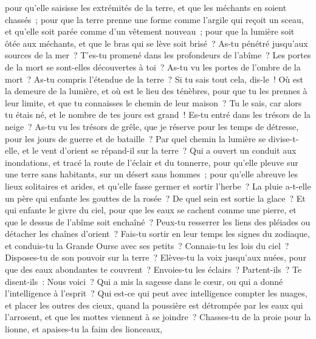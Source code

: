 \begin{multicols}{2}
pour qu'elle saisisse les extrémités de la terre, et que les méchants en soient chassés~;
pour que la terre prenne une forme comme l'argile qui reçoit un sceau, et qu'elle soit parée comme d'un vêtement nouveau~;
pour que la lumière soit ôtée aux méchants, et que le bras qui se lève soit brisé~?
As-tu pénétré jusqu'aux sources de la mer~? T'es-tu promené dans les profondeurs de l'abîme~?
Les portes de la mort se sont-elles découvertes à toi~? As-tu vu les portes de l'ombre de la mort~?
As-tu compris l'étendue de la terre~? Si tu sais tout cela, dis-le~!
Où est la demeure de la lumière, et où est le lieu des ténèbres,
pour que tu les prennes à leur limite, et que tu connaisses le chemin de leur maison~?
Tu le sais, car alors tu étais né, et le nombre de tes jours est grand~!
Es-tu entré dans les trésors de la neige~? As-tu vu les trésors de grêle,
que je réserve pour les temps de détresse, pour les jours de guerre et de bataille~?
Par quel chemin la lumière se divise-t-elle, et le vent d'orient se répand-il sur la terre~?
Qui a ouvert un conduit aux inondations, et tracé la route de l'éclair et du tonnerre,
pour qu'elle pleuve sur une terre sans habitants, sur un désert sans hommes~;
pour qu'elle abreuve les lieux solitaires et arides, et qu'elle fasse germer et sortir l'herbe~?
La pluie a-t-elle un père qui enfante les gouttes de la rosée~?
De quel sein est sortie la glace~? Et qui enfante le givre du ciel,
pour que les eaux se cachent comme une pierre, et que le dessus de l'abîme soit enchaîné~?
Peux-tu resserrer les liens des pléiades ou détacher les chaînes d'orient~?
Fais-tu sortir en leur temps les signes du zodiaque, et conduis-tu la Grande Ourse avec ses petits~?
Connais-tu les lois du ciel~? Disposes-tu de son pouvoir sur la terre~?
Elèves-tu la voix jusqu'aux nuées, pour que des eaux abondantes te couvrent~?
Envoies-tu les éclairs~? Partent-ils~? Te disent-ils~: Nous voici~?
Qui a mis la sagesse dans le cœur, ou qui a donné l'intelligence à l'esprit~?
Qui est-ce qui peut avec intelligence compter les nuages, et placer les outres des cieux,
quand la poussière est détrompée par les eaux qui l'arrosent, et que les mottes viennent à se joindre~?
\VerseOne{}Chasses-tu de la proie pour la lionne, et apaises-tu la faim des lionceaux,

\end{multicols}
